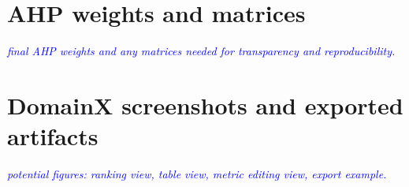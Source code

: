 \documentclass[final,1p,times,authoryear,12pt]{elsarticle}
\providecommand{\wss}[1]{\textcolor{blue}{\textit{#1}}}
\begin{document}
\section{AHP weights and matrices}\label{app-ahp}
\wss{ final AHP weights and any matrices needed for transparency and reproducibility.}

\section{DomainX screenshots and exported artifacts}\label{app-tool}
\wss{potential figures: ranking view, table view, metric editing view, export example. }



\end{document}
